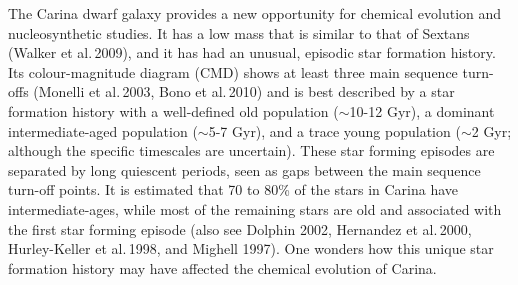 \documentclass{emulateapj}
\newcommand\etal{{\rm et al.\,}}
\begin{document}


The Carina dwarf galaxy provides a new opportunity for chemical 
evolution and nucleosynthetic studies.  It has a low mass that is 
similar to that of Sextans (Walker \etal 2009), and it has had 
an unusual, episodic star formation history.  Its colour-magnitude 
diagram (CMD) shows at least three main sequence turn-offs 
(Monelli \etal  2003, Bono \etal  2010) and is best described 
by a star formation history with a well-defined old population 
($\sim$10-12 Gyr), a dominant intermediate-aged population 
($\sim$5-7 Gyr), and a trace young population ($\sim$2 Gyr;
although the specific timescales are uncertain).   
These star forming episodes are separated by 
long quiescent periods, seen as gaps between the main sequence turn-off 
points.  It is estimated that 70 to 80\% of the stars in Carina have 
intermediate-ages, while most of the remaining stars are old and 
associated with the first star forming episode (also see Dolphin 2002, 
Hernandez \etal  2000, Hurley-Keller \etal  1998, and Mighell 1997).  
One wonders how this unique star formation history may have 
affected the chemical evolution of Carina. 
 
\end{document}
